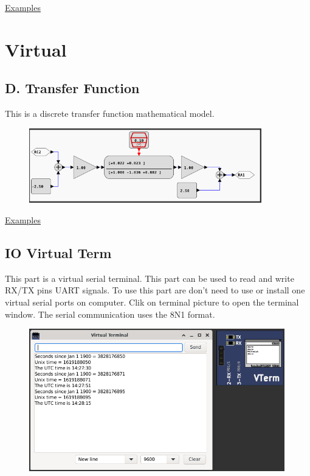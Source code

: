 \href{https://lcgamboa.github.io/picsimlab_examples/parts_Temperature_System.html}{Examples}

\section{Virtual}

\subsection{D. Transfer Function}

This is a discrete transfer function mathematical model. 

\begin{figure}[H]
\center
\includegraphics[width=0.9\textwidth]{img/part_dtransferf.png} 
\end{figure} 

\href{https://lcgamboa.github.io/picsimlab_examples/parts_D._Transfer_Function.html}{Examples}

\subsection{IO Virtual Term} \hypertarget{def:vterm}{}

This part is a virtual serial terminal. This part can be used to read and write RX/TX pins UART signals.
To use this part are don't need to use or install one virtual serial ports on computer.  
Clik on terminal picture to open the terminal window.
The serial communication uses the 8N1 format.

\begin{figure}[H]
\center
\includegraphics[width=0.99\textwidth]{img/part_vterm.png} 
\end{figure} 

